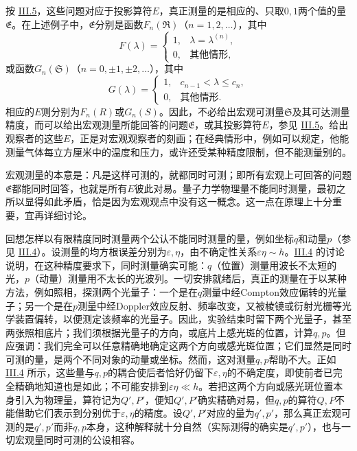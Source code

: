 \documentclass[fontsize=13pt,twoside,openany,headings=normal,parskip=false,bookmarkpackage=false,DIV=calc]{scrbook}
\begin{document}
按 \hyperref[sec:III.5]{III.5}，这些问题对应于投影算符$E$，真正测量的是相应的、只取$0,\allowbreak 1$两个值的量$\mathfrak E$。在上述例子中，$\mathfrak E$分别是函数$F_n(\mathfrak R)$（$n=1,\allowbreak 2,\allowbreak \ldots$），其中
\[
F(\lambda)=\begin{cases}1,&\lambda=\lambda^{(n)},\\0,&\text{其他情形},\end{cases}
\]
或函数$G_n(\mathfrak S)$（$n=0,\allowbreak \pm1,\allowbreak \pm2,\allowbreak \ldots$），其中
\[
G(\lambda)=\begin{cases}1,&c_{n-1}<\lambda\leq c_n,\\0,&\text{其他情形}.\end{cases}
\]
相应的$E$则分别为$F_n(R)$或$G_n(S)$。因此，不必给出宏观可测量$\mathfrak S$及其可达测量精度，而可以给出宏观测量所能回答的问题$\mathfrak E$，或其投影算符$E$，参见 \hyperref[sec:III.5]{III.5}。给出观察者的这些$E$，正是对宏观观察者的刻画；在经典情形中，例如可以规定，他能测量气体每立方厘米中的温度和压力，或许还受某种精度限制，但不能测量别的。

宏观测量的本意是：凡是这样可测的，就都同时可测；即所有宏观上可回答的问题$\mathfrak E$都能同时回答，也就是所有$E$彼此对易。量子力学物理量不能同时测量，最初之所以显得如此矛盾，恰是因为宏观观点中没有这一概念。这一点在原理上十分重要，宜再详细讨论。

回想怎样以有限精度同时测量两个公认不能同时测量的量，例如坐标$q$和动量$p$（参见 \hyperref[sec:III.4]{III.4}）。设测量的均方根误差分别为$\varepsilon,\allowbreak \eta$，由不确定性关系$\varepsilon\eta\sim h$。\hyperref[sec:III.4]{III.4} 的讨论说明，在这种精度要求下，同时测量确实可能：$q$（位置）测量用波长不太短的光，$p$（动量）测量用不太长的光波列。一切安排就绪后，真正的测量在于以某种方法，例如照相，探测两个光量子：\hypertarget{origpage-215}{}\label{origpage-215}一个是在$q$测量中经Compton效应偏转的光量子；另一个是在$p$测量中经Doppler效应反射、频率改变，又被棱镜或衍射光栅等光学装置偏转，以便测定该频率的光量子。因此，实验结束时留下两个光量子，甚至两张照相底片；我们须根据光量子的方向，或底片上感光斑的位置，计算$q,\allowbreak p$。但应强调：我们完全可以任意精确地确定这两个方向或感光斑位置；它们显然是同时可测的量，是两个不同对象的动量或坐标。然而，这对测量$q,\allowbreak p$帮助不大。正如 \hyperref[sec:III.4]{III.4} 所示，这些量与$q,\allowbreak p$的耦合使后者恰好仍留下$\varepsilon,\allowbreak \eta$的不确定度，即使前者已完全精确地知道也是如此；不可能安排到$\varepsilon\eta\ll h$。若把这两个方向或感光斑位置本身引入为物理量，算符记为$Q',\allowbreak P'$，便知$Q',\allowbreak P'$确实精确对易，但$q,\allowbreak p$的算符$Q,\allowbreak P$不能借助它们表示到分别优于$\varepsilon,\allowbreak \eta$的精度。设$Q',\allowbreak P'$对应的量为$q',\allowbreak p'$，那么真正宏观可测的是$q',\allowbreak p'$而非$q,\allowbreak p$本身，这种解释就十分自然（实际测得的确实是$q',\allowbreak p'$），也与一切宏观量同时可测的公设相容。
\end{document}

